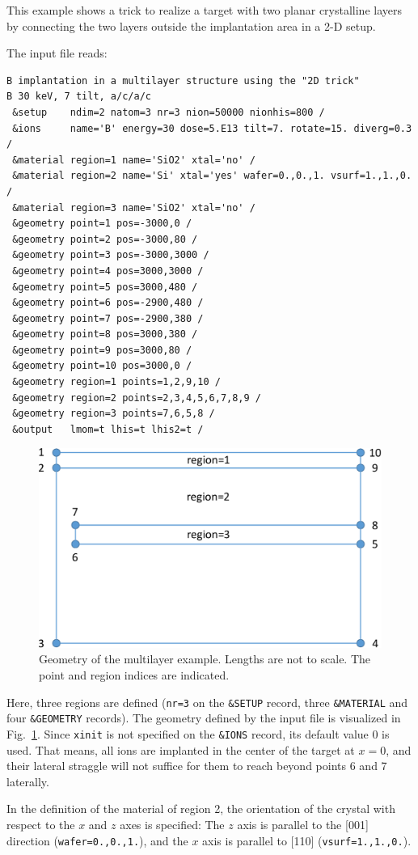 This example shows a trick to realize a target with two planar crystalline
layers by connecting the two layers outside the implantation area in a 2-D
setup.

The input file reads:

\begin{verbatim}
B implantation in a multilayer structure using the "2D trick"
B 30 keV, 7 tilt, a/c/a/c
 &setup    ndim=2 natom=3 nr=3 nion=50000 nionhis=800 /
 &ions     name='B' energy=30 dose=5.E13 tilt=7. rotate=15. diverg=0.3 /
 &material region=1 name='SiO2' xtal='no' /
 &material region=2 name='Si' xtal='yes' wafer=0.,0.,1. vsurf=1.,1.,0. /
 &material region=3 name='SiO2' xtal='no' /
 &geometry point=1 pos=-3000,0 /
 &geometry point=2 pos=-3000,80 /
 &geometry point=3 pos=-3000,3000 /
 &geometry point=4 pos=3000,3000 /
 &geometry point=5 pos=3000,480 /
 &geometry point=6 pos=-2900,480 /
 &geometry point=7 pos=-2900,380 /
 &geometry point=8 pos=3000,380 /
 &geometry point=9 pos=3000,80 /
 &geometry point=10 pos=3000,0 /
 &geometry region=1 points=1,2,9,10 /
 &geometry region=2 points=2,3,4,5,6,7,8,9 /
 &geometry region=3 points=7,6,5,8 /
 &output   lmom=t lhis=t lhis2=t /
\end{verbatim}

\begin{figure}[htbp]
\centering
\noindent\includegraphics[scale=0.6]{ex_multilayer-crop.pdf}
\caption{Geometry of the multilayer example. Lengths are not to scale. The
point and region indices are indicated.}
\label{fig:multilayer}
\end{figure}

Here, three regions are defined (\texttt{nr=3} on the \texttt{\&SETUP} record,
three \texttt{\&MATERIAL} and four \texttt{\&GEOMETRY} records). The geometry
defined by the input file is visualized in Fig.~\ref{fig:multilayer}. Since
\texttt{xinit} is not specified on the \texttt{\&IONS} record, its default
value 0 is used. That means, all ions are implanted in the center of the target
at $x=0$, and their lateral straggle will not suffice for them to reach beyond
points 6 and 7 laterally.

In the definition of the material of region 2, the orientation of the crystal
with respect to the $x$ and $z$ axes is specified: The $z$ axis is parallel to
the [001] direction (\texttt{wafer=0.,0.,1.}), and the $x$ axis is parallel to
[110] (\texttt{vsurf=1.,1.,0.}).

